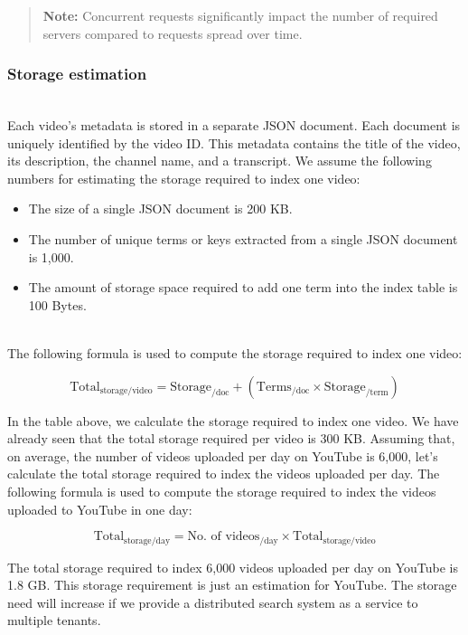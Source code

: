 \begin{quote}
\textbf{Note:} Concurrent requests significantly impact the number of required servers compared to requests spread over time.
\end{quote}
\subsubsection{Storage estimation}\label{bnW2wU1UrY9LsQ9D6a177}
\\
Each video's metadata is stored in a separate JSON document. Each document is uniquely identified by the video ID. This metadata contains the title of the video, its description, the channel name, and a transcript. We assume the following numbers for estimating the storage required to index one video:

\begin{itemize}
\item
\protect{}\label{tNNMR8YTnMCJXbOYvCLJi}
The size of a single JSON document is 200 KB.
\item
\protect{}\label{3BaN2t20TFwQkhHh9e3kG}
The number of unique terms or keys extracted from a single JSON document is 1,000.
\item
\protect{}\label{puRsVglFdhHfEsvX2cw9U}
The amount of storage space required to add one term into the index table is 100 Bytes.
\end{itemize}
\\
The following formula is used to compute the storage required to index one video:

\[
\text{Total}_{\text{storage/video}} = \text{Storage}_{\text{/doc}} + \left( \text{Terms}_{\text{/doc}} \times \text{Storage}_{\text{/term}} \right)
\]

In the table above, we calculate the storage required to index one video. We have already seen that the total storage required per video is 300 KB. Assuming that, on average, the number of videos uploaded per day on YouTube is 6,000, let's calculate the total storage required to index the videos uploaded per day. The following formula is used to compute the storage required to index the videos uploaded to YouTube in one day:

\[
\text{Total}_{\text{storage/day}} = \text{No. of videos}_{\text{/day}} \times \text{Total}_{\text{storage/video}}
\]

The total storage required to index 6,000 videos uploaded per day on YouTube is 1.8 GB. This storage requirement is just an estimation for YouTube. The storage need will increase if we provide a distributed search system as a service to multiple tenants.

